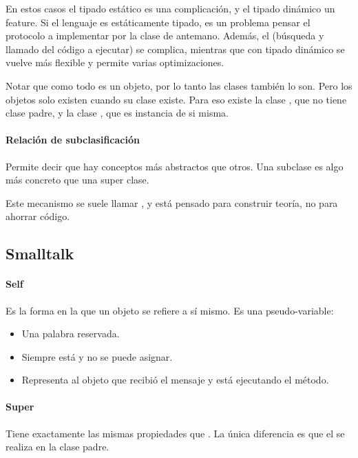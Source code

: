 En estos casos el tipado estático es una complicación, y el tipado dinámico un feature. Si el lenguaje es estáticamente tipado, es un problema pensar el protocolo a implementar por la clase de antemano. Además, el  (búsqueda y llamado del código a ejecutar) se complica, mientras que con tipado dinámico se vuelve más flexible y permite varias optimizaciones.

Notar que como todo es un objeto, por lo tanto las clases también lo son. Pero los objetos solo existen cuando su clase existe. Para eso existe la clase , que no tiene clase padre, y la clase , que es instancia de si misma.

\paragraph{Relación de subclasificación}

Permite decir que hay conceptos más abstractos que otros. Una subclase es algo más concreto que una super clase.

Este mecanismo se suele llamar , y está pensado para construir teoría, no para ahorrar código.

\subsection{Smalltalk}

\paragraph{Self}

Es la forma en la que un objeto se refiere a sí mismo. Es una pseudo-variable:
\begin{itemize}
  \item Una palabra reservada.
  \item Siempre está y no se puede asignar.
  \item Representa al objeto que recibió el mensaje y está ejecutando el método.
\end{itemize}

\paragraph{Super}

Tiene exactamente las mismas propiedades que . La única diferencia es que el  se realiza en la clase padre.

